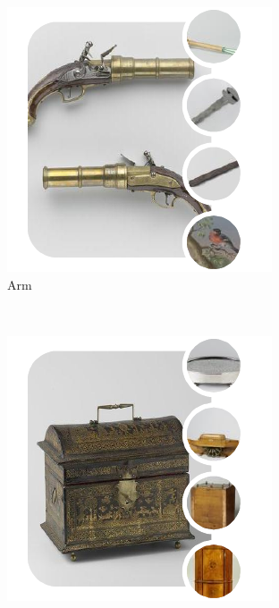 \documentclass[runningheads]{llncs}
\begin{document}
\begin{figure}
	\centering
	\begin{subfigure}[b]{0.3\textwidth}
		\includegraphics[width=\textwidth]{figures/data_supervisor/arm}
		\caption{Arm}
		\label{fig:arm}
	\end{subfigure}
	~ %
	\begin{subfigure}[b]{0.3\textwidth}
		\includegraphics[width=\textwidth]{figures/data_supervisor/bag}

\end{subfigure}
\end{figure}
\end{document}
